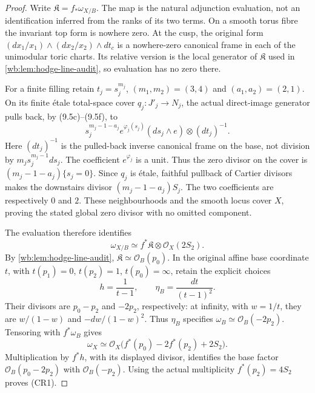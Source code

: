 \begin{proof}
Write $\mathfrak K=f_*\omega_{X/B}$. The map is the natural adjunction
evaluation, not an identification inferred from the ranks of its two
terms. On a smooth torus fibre the invariant top form is nowhere zero.
At the cusp, the original form
$(dx_1/x_1)\wedge(dx_2/x_2)\wedge dt_c$ is a nowhere-zero canonical
frame in each of the unimodular toric charts. Its relative version is
the local generator of $\mathfrak K$ used in
\cref{wb:lem:hodge-line-audit}, so evaluation has no zero there.

For a finite filling retain $t_j=s_j^{m_j}$,
$(m_1,m_2)=(3,4)$ and $(a_1,a_2)=(2,1)$. On its finite \'etale
total-space cover $q_j:J'_j\to N_j$, the actual direct-image generator
pulls back, by (9.5c)--(9.5f), to
\[
 s_j^{m_j-1-a_j}e^{\varphi_j(s_j)}
       (ds_j\wedge e)\otimes(dt_j)^{-1}.
 \tag{CR5}
\]
Here $(dt_j)^{-1}$ is the pulled-back inverse canonical frame on the
base, not division by $m_js_j^{m_j-1}ds_j$. The coefficient
$e^{\varphi_j}$ is a unit. Thus the zero divisor on the cover is
$(m_j-1-a_j)\{s_j=0\}$. Since $q_j$ is \'etale, faithful pullback
of Cartier divisors makes the downstairs divisor
$(m_j-1-a_j)S_j$. The two coefficients are respectively $0$ and $2$.
These neighbourhoods and the smooth locus cover $X$, proving the stated
global zero divisor with no omitted component.

The evaluation therefore identifies
\[
 \omega_{X/B}\simeq f^*\mathfrak K\otimes\mathcal O_X(2S_2).
\]
By \cref{wb:lem:hodge-line-audit}, $\mathfrak K\simeq\mathcal O_B(p_0)$.
In the original affine base coordinate $t$, with
$t(p_1)=0$, $t(p_2)=1$, $t(p_0)=\infty$, retain the explicit choices
\[
 h=\frac1{t-1},\qquad \eta_B=\frac{dt}{(t-1)^2}.
\]
Their divisors are $p_0-p_2$ and $-2p_2$, respectively: at infinity,
with $w=1/t$, they are $w/(1-w)$ and $-dw/(1-w)^2$.
Thus $\eta_B$ specifies $\omega_B\simeq\mathcal O_B(-2p_2)$.
Tensoring with $f^*\omega_B$ gives
\[
 \omega_X\simeq
 \mathcal O_X\bigl(f^*(p_0)-2f^*(p_2)+2S_2\bigr).
\]
Multiplication by $f^*h$, with its displayed divisor, identifies the
base factor $\mathcal O_B(p_0-2p_2)$ with $\mathcal O_B(-p_2)$.
Using the actual multiplicity $f^*(p_2)=4S_2$ proves (CR1).


\end{proof}
